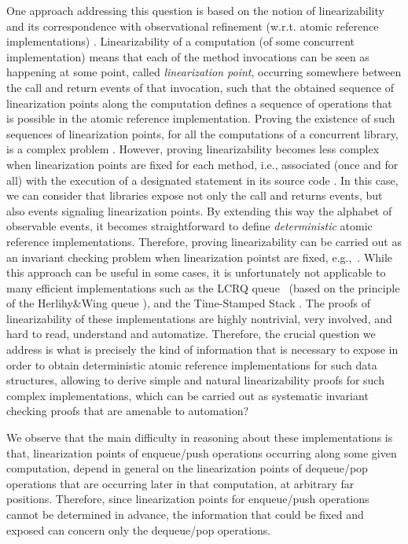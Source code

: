 One approach addressing this question is based on the notion of linearizability \cite{journals/toplas/HerlihyW90} and its correspondence with observational refinement (w.r.t. atomic reference implementations) \cite{journals/tcs/FilipovicORY10,DBLP:conf/popl/BouajjaniEEH15}. Linearizability of a computation (of some concurrent implementation) means that each of the method invocations can be seen as happening at some point, called {\em linearization point}, occurring somewhere between the call and return events of that invocation, such that the obtained sequence of linearization points along the computation defines a sequence of operations that is possible in the atomic reference implementation. Proving the existence of such sequences of linearization points, for all the computations of a concurrent library, is a complex problem \cite{journals/iandc/AlurMP00,conf/esop/BouajjaniEEH13,DBLP:conf/netys/Hamza15}. 
%
However, proving linearizability becomes less complex when linearization points are fixed for each method, i.e., associated (once and for all) with the execution of a designated statement in its source code \cite{conf/esop/BouajjaniEEH13}. In this case, we can consider that libraries expose not only the call and returns events, but also events signaling linearization points. By extending this way the alphabet of observable events, it becomes straightforward to define {\em deterministic} atomic reference implementations. Therefore, proving linearizability can be carried out as an invariant checking problem when linearization pointst are fixed, e.g.,~\cite{conf/ppopp/VafeiadisHHS06,conf/cav/AmitRRSY07,conf/vmcai/Vafeiadis09,conf/tacas/AbdullaHHJR13}.
%
While this approach can be useful in some cases, it is unfortunately not applicable to many efficient implementations such as the LCRQ queue~\cite{DBLP:conf/ppopp/MorrisonA13} (based on the principle of the Herlihy\&Wing queue \cite{journals/toplas/HerlihyW90}), and the Time-Stamped Stack \cite{DBLP:conf/popl/DoddsHK15}. The proofs of linearizability of these implementations are highly nontrivial, very involved, and hard to read, understand and automatize. Therefore, the crucial question we address is what is precisely the kind of information that is necessary to expose in order to obtain deterministic atomic reference implementations for such data structures, allowing to derive simple and natural linearizability proofs for such complex implementations, which can be carried out as systematic invariant checking proofs that are amenable to automation?

We observe that the main difficulty in reasoning about these implementations is that, linearization points of enqueue/push operations occurring along some given computation, depend in general on the linearization points of dequeue/pop operations that are occurring later in that computation, at arbitrary far positions. Therefore, since linearization points for enqueue/push operations cannot be determined in advance, the information that could be fixed and exposed can concern only the dequeue/pop operations. 

